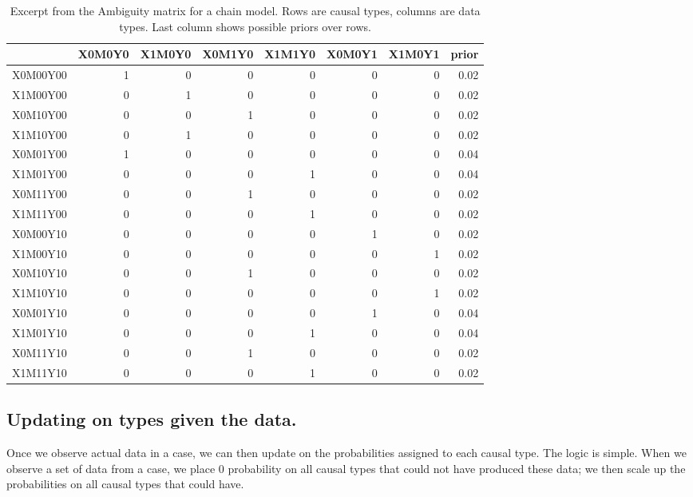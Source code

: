 \documentclass[
  12pt,
]{book}
\begin{document}
\begin{table}

\caption{\label{tab:ambigmatrixmed}Excerpt from the Ambiguity matrix for a chain model. Rows are causal types, columns are data types. Last column shows possible priors over rows.}
\centering
\begin{tabular}[t]{lrrrrrrr}
\toprule
  & X0M0Y0 & X1M0Y0 & X0M1Y0 & X1M1Y0 & X0M0Y1 & X1M0Y1 & prior\\
\midrule
X0M00Y00 & 1 & 0 & 0 & 0 & 0 & 0 & 0.02\\
X1M00Y00 & 0 & 1 & 0 & 0 & 0 & 0 & 0.02\\
X0M10Y00 & 0 & 0 & 1 & 0 & 0 & 0 & 0.02\\
X1M10Y00 & 0 & 1 & 0 & 0 & 0 & 0 & 0.02\\
X0M01Y00 & 1 & 0 & 0 & 0 & 0 & 0 & 0.04\\
\addlinespace
X1M01Y00 & 0 & 0 & 0 & 1 & 0 & 0 & 0.04\\
X0M11Y00 & 0 & 0 & 1 & 0 & 0 & 0 & 0.02\\
X1M11Y00 & 0 & 0 & 0 & 1 & 0 & 0 & 0.02\\
X0M00Y10 & 0 & 0 & 0 & 0 & 1 & 0 & 0.02\\
X1M00Y10 & 0 & 0 & 0 & 0 & 0 & 1 & 0.02\\
\addlinespace
X0M10Y10 & 0 & 0 & 1 & 0 & 0 & 0 & 0.02\\
X1M10Y10 & 0 & 0 & 0 & 0 & 0 & 1 & 0.02\\
X0M01Y10 & 0 & 0 & 0 & 0 & 1 & 0 & 0.04\\
X1M01Y10 & 0 & 0 & 0 & 1 & 0 & 0 & 0.04\\
X0M11Y10 & 0 & 0 & 1 & 0 & 0 & 0 & 0.02\\
\addlinespace
X1M11Y10 & 0 & 0 & 0 & 1 & 0 & 0 & 0.02\\
\bottomrule
\end{tabular}
\end{table}

\hypertarget{updating-on-types-given-the-data.}{%
\subsection{Updating on types given the data.}\label{updating-on-types-given-the-data.}}

Once we observe actual data in a case, we can then update on the probabilities assigned to each causal type. The logic is simple. When we observe a set of data from a case, we place \(0\) probability on all causal types that could not have produced these data; we then scale up the probabilities on all causal types that could have.
\end{document}
